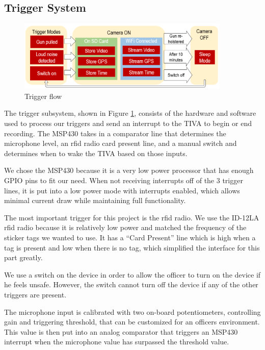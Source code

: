 \documentclass[12pt]{article}
\begin{document}
\subsection{Trigger System}
\label{sec:sys_trigger}

\begin{figure}[h]
    \centering
    \includegraphics[width=0.9\textwidth]{trigger_flow}
    \caption{Trigger flow}
    \label{fig:trigger_flow}
\end{figure}

The trigger subsystem, shown in Figure \ref{fig:trigger_flow}, consists of the
hardware and software used to process our triggers and send an interrupt to the
TIVA to begin or end recording. The MSP430 takes in a comparator line that
determines the microphone level, an \gls{rfid} radio card present line, and a
manual switch and determines when to wake the TIVA based on those inputs.

We chose the MSP430 because it is a very low power processor that has enough
GPIO pins to fit our need. When not receiving interrupts off of the 3 trigger
lines, it is put into a low power mode with interrupts enabled, which allows
minimal current draw while maintaining full functionality.

The most important trigger for this project is the \gls{rfid} radio. We use the
ID-12LA \gls{rfid} radio because it is relatively low power and matched the
frequency of the sticker tags we wanted to use. It has a ``Card Present'' line
which is high when a tag is present and low when there is no tag, which
simplified the interface for this part greatly. 

We use a switch on the device in order to allow the officer to turn on the
device if he feels unsafe. However, the switch cannot turn off the device if
any of the other triggers are present. 

The microphone input is calibrated with two on-board potentiometers,
controlling gain and triggering threshold, that can be customized for an
officers environment. This value is then put into an analog comparator that
triggers an MSP430 interrupt when the microphone value has surpassed the
threshold value. 
\end{document}
